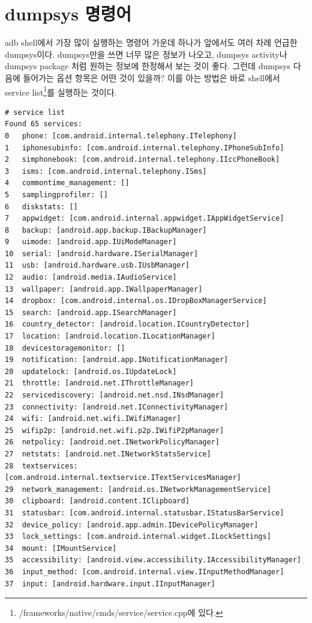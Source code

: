 \section{dumpsys 명령어}\label{sec:dumpsys}
adb shell에서 가장 많이 실행하는 명령어 가운데 하나가 앞에서도 여러 차례 언급한 dumpsys이다. 
dumpsys만을 쓰면 너무 많은 정보가 나오고, dumpsys activity나 dumpsys package 처럼 원하는 정보에 한정해서 보는 것이 좋다.
그런데 dumpsys 다음에 들어가는 옵션 항목은 어떤 것이 있을까? 이를 아는 방법은 바로 shell에서 service list\footnote{/frameworks/native/cmds/service/service.cpp에 있다.}를 실행하는 것이다.
\begin{lstlisting}[frame=single] 
# service list
Found 65 services:
0	phone: [com.android.internal.telephony.ITelephony]
1	iphonesubinfo: [com.android.internal.telephony.IPhoneSubInfo]
2	simphonebook: [com.android.internal.telephony.IIccPhoneBook]
3	isms: [com.android.internal.telephony.ISms]
4	commontime_management: []
5	samplingprofiler: []
6	diskstats: []
7	appwidget: [com.android.internal.appwidget.IAppWidgetService]
8	backup: [android.app.backup.IBackupManager]
9	uimode: [android.app.IUiModeManager]
10	serial: [android.hardware.ISerialManager]
11	usb: [android.hardware.usb.IUsbManager]
12	audio: [android.media.IAudioService]
13	wallpaper: [android.app.IWallpaperManager]
14	dropbox: [com.android.internal.os.IDropBoxManagerService]
15	search: [android.app.ISearchManager]
16	country_detector: [android.location.ICountryDetector]
17	location: [android.location.ILocationManager]
18	devicestoragemonitor: []
19	notification: [android.app.INotificationManager]
20	updatelock: [android.os.IUpdateLock]
21	throttle: [android.net.IThrottleManager]
22	servicediscovery: [android.net.nsd.INsdManager]
23	connectivity: [android.net.IConnectivityManager]
24	wifi: [android.net.wifi.IWifiManager]
25	wifip2p: [android.net.wifi.p2p.IWifiP2pManager]
26	netpolicy: [android.net.INetworkPolicyManager]
27	netstats: [android.net.INetworkStatsService]
28	textservices: [com.android.internal.textservice.ITextServicesManager]
29	network_management: [android.os.INetworkManagementService]
30	clipboard: [android.content.IClipboard]
31	statusbar: [com.android.internal.statusbar.IStatusBarService]
32	device_policy: [android.app.admin.IDevicePolicyManager]
33	lock_settings: [com.android.internal.widget.ILockSettings]
34	mount: [IMountService]
35	accessibility: [android.view.accessibility.IAccessibilityManager]
36	input_method: [com.android.internal.view.IInputMethodManager]
37	input: [android.hardware.input.IInputManager]

\end{lstlisting}
